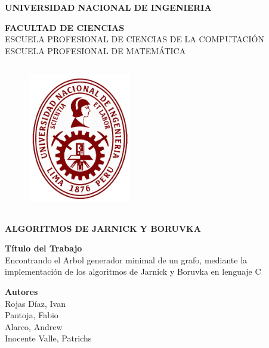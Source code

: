 \documentclass[a4paper]{article}
\begin{document}
\begin{titlepage}
\begin{center}
\vspace*{-0.4in}

{\fontsize{12}{30}\bf \selectfont UNIVERSIDAD NACIONAL DE INGENIERIA\\}

{\fontsize{12}{40}\bf \selectfont FACULTAD DE CIENCIAS\\}
\vspace*{0.15in} ESCUELA PROFESIONAL DE CIENCIAS DE LA COMPUTACI\'ON\\
\vspace*{0.08in}
\vspace*{0.15in} ESCUELA PROFESIONAL DE MATEM\'ATICA\\
\vspace*{0.2in}
\begin{figure}[htb]
\begin{center}
\includegraphics[width=4.5cm,height=6.5cm]{UNI.png}
\end{center}
\end{figure}
\begin{Large}
\textbf{ALGORITMOS DE JARNICK Y BORUVKA\\}
\end{Large}
\vspace*{0.2in}

\begin{large}
{\bf T\'itulo del Trabajo\\}
\vspace*{0.1in}
{\fontsize{12}{13}\selectfont 
Encontrando el Arbol generador minimal de un grafo, mediante la implementaci\'on de los algoritmos de Jarnick y Boruvka en lenguaje C\\}
\end{large}
\vspace*{0.3in}

\begin{large}
{\bf Autores} 
\vspace*{0.1in}
\\Rojas D\'iaz, Ivan\\
Pantoja, Fabio \\Alarco, Andrew\\
Inocente Valle, Patrichs
\end{large}


\end{center}
\end{titlepage}
\end{document}
